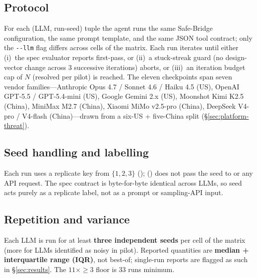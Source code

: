 \subsection{Protocol}
\label{sec:method-protocol}

For each (LLM, run-seed) tuple the agent runs the same Safe-Bridge
configuration, the same prompt template, and the same JSON tool
contract; only the \texttt{-{}-llm} flag differs across cells of the
matrix. Each run iterates until either (i)~the spec evaluator
reports first-pass, or (ii)~a stuck-streak guard (no design-vector
change across 3 successive iterations) aborts, or (iii)~an
iteration budget cap of $N$ (resolved per pilot) is reached. The eleven
checkpoints span seven vendor families---Anthropic Opus 4.7 /
Sonnet 4.6 / Haiku 4.5 (US), OpenAI GPT-5.5 / GPT-5.4-mini (US),
Google Gemini 2.x (US), Moonshot Kimi K2.5 (China),
MiniMax M2.7 (China), Xiaomi MiMo v2.5-pro (China), DeepSeek
V4-pro / V4-flash (China)---drawn from a six-US + five-China split
(\S\ref{sec:platform-threat}).

\subsection{Seed handling and labelling}
\label{sec:method-seed}

Each run uses a replicate key from $\{1, 2, 3\}$
();
() does not pass the
seed to  or any API request. The spec
contract is byte-for-byte identical across LLMs, so seed acts
purely as a replicate label, not as a prompt or sampling-API
input.

\subsection{Repetition and variance}
\label{sec:method-rep}

Each LLM is run for at least \textbf{three independent seeds} per
cell of the matrix (more for LLMs identified as noisy in pilot).
Reported quantities are \textbf{median + interquartile range
(IQR)}, not best-of; single-run reports are flagged as such in
\S\ref{sec:results}. The $11\times\geq 3$ floor is 33 runs minimum.

